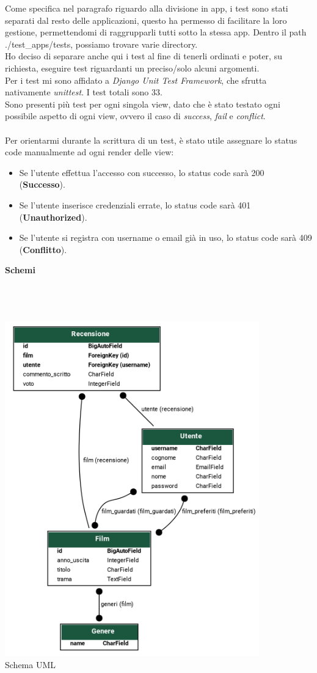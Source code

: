 \documentclass[12pt]{article}
\begin{document}
	\noindent Come specifica nel paragrafo riguardo alla divisione in app, i test sono stati separati dal resto delle applicazioni, questo ha permesso di facilitare la loro gestione, permettendomi di raggrupparli tutti sotto la stessa app. Dentro il path ./test\_apps/tests, possiamo trovare varie directory. \\Ho deciso di separare anche qui i test al fine di tenerli ordinati e poter, su richiesta, eseguire test riguardanti un preciso/solo alcuni argomenti. \\
	Per i test mi sono affidato a \textit{Django Unit Test Framework}, che sfrutta nativamente \textit{unittest}.
	I test totali sono 33. \\
	Sono presenti più test per ogni singola view, dato che è stato testato ogni possibile aspetto di ogni view, ovvero il caso di \textit{success}, \textit{fail} e \textit{conflict}. \\ \\
	Per orientarmi durante la scrittura di un test, è stato utile assegnare lo status code manualmente ad ogni render delle view:
	\begin{itemize}
		\item Se l'utente effettua l'accesso con successo, lo status code sarà 200 (\textbf{Successo}).
		\item Se l'utente inserisce credenziali errate, lo status code sarà 401 (\textbf{Unauthorized}).
		\item Se l'utente si registra con username o email già in uso, lo status code sarà 409 (\textbf{Conflitto}).
	\end{itemize}
	\pagebreak
	
	
	\noindent \centerline {\Huge \textbf{Schemi}} \\ \\ \\
	\centering \includegraphics[width=11cm, ]{Immagini/uml_schema_streamify.png} \\
	\centering Schema UML
	
	
	
	
\end{document}
